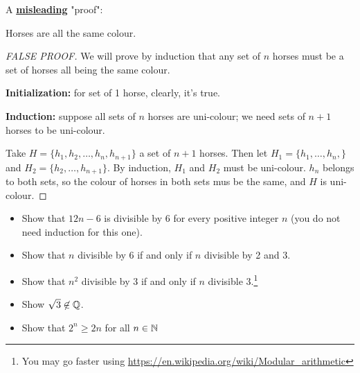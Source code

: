 A \textbf{\underline{misleading}} "proof":
\begin{property}
    Horses are all the same colour.
\end{property}
\begin{proof}[FALSE PROOF]
    We will prove by induction that any set of $n$ horses must be a set of horses all being the same colour.
    
    \textbf{Initialization:} for set of 1 horse, clearly, it's true.
    
    \textbf{Induction:} suppose all sets of $n$ horses are uni-colour; we need sets of $n+1$ horses to be uni-colour.
    
    Take $H=\{ h_1, h_2, \dots, h_n, h_{n+1} \}$ a set of $n+1$ horses.
    Then let $H_1 = \{ h_1, \dots, h_n, \}$ and $H_2 = \{ h_2, \dots, h_{n+1} \}$.
    By induction, $H_1$ and $H_2$ must be uni-colour.
    $h_n$ belongs to both sets, so the colour of horses in both sets mus be the same, and $H$ is uni-colour.
\end{proof}
\begin{question}
    \begin{itemize}
        \item Show that $12n-6$ is divisible by 6 for every positive integer $n$ (you do not need induction for this one).
        \item Show that $n$ divisible by 6 if and only if $n$ divisible by 2 and 3.
        \item Show that $n^2$ divisible by 3 if and only if $n$ divisible 3.\footnote{You may go faster using \url{https://en.wikipedia.org/wiki/Modular_arithmetic}}
        \item Show $\sqrt{3} \not\in \mathbb{Q}$.
        \item Show that $2^n \geq 2n$ for all $n \in \mathbb{N}$
    \end{itemize}
\end{question}



